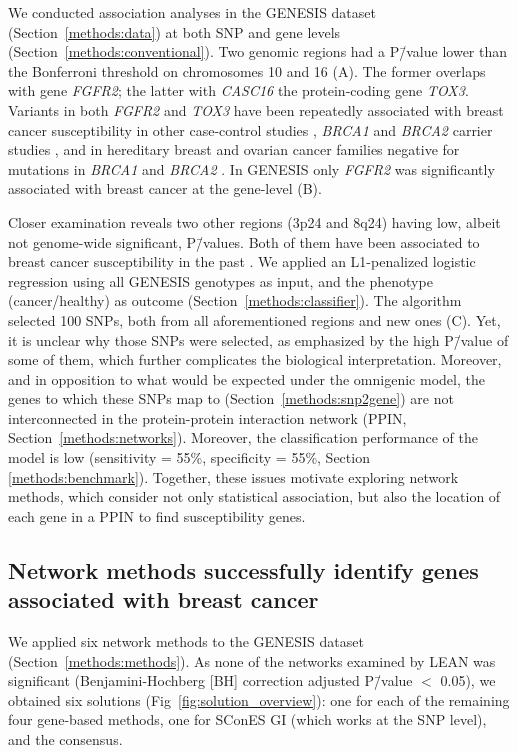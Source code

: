 \documentclass[10pt,letterpaper]{article}
\begin{document}
We conducted association analyses in the GENESIS dataset (Section~\ref{methods:data}) at both SNP and gene levels (Section~\ref{methods:conventional}). Two genomic regions had a P\=/value lower than the Bonferroni threshold on chromosomes 10 and 16 (A). The former overlaps with gene \emph{FGFR2}; the latter with \emph{CASC16} the protein-coding gene \emph{TOX3}. Variants in both \emph{FGFR2} and \emph{TOX3} have been repeatedly associated with breast cancer susceptibility in other case-control studies \cite{Michailidou2017}, \emph{BRCA1} and \emph{BRCA2} carrier studies \cite{Mulligan2011}, and in hereditary breast and ovarian cancer families negative for mutations in \emph{BRCA1} and \emph{BRCA2} \cite{rinella_genetic_2013}. In GENESIS only \emph{FGFR2} was significantly associated with breast cancer at the gene-level (B).

Closer examination reveals two other regions (3p24 and 8q24) having low, albeit not genome-wide significant, P\=/values. Both of them have been associated to breast cancer susceptibility in the past \cite{brisbin_meta-analysis_2011,search_newly_2009}. We applied an L1-penalized logistic regression using all GENESIS genotypes as input, and the phenotype (cancer/healthy) as outcome (Section~\ref{methods:classifier}). The algorithm selected 100 SNPs, both from all aforementioned regions and new ones (C). Yet, it is unclear why those SNPs were selected, as emphasized by the high P\=/value of some of them, which further complicates the biological interpretation. Moreover, and in opposition to what would be expected under the omnigenic model, the genes to which these SNPs map to (Section~\ref{methods:snp2gene}) are not interconnected in the protein-protein interaction network (PPIN, Section~\ref{methods:networks}). Moreover, the classification performance of the model is low (sensitivity = 55\%, specificity = 55\%, Section \ref{methods:benchmark}). Together, these issues motivate exploring network methods, which consider not only statistical association, but also the location of each gene in a PPIN to find susceptibility genes.

\subsection{Network methods successfully identify genes associated with breast cancer}
\label{results:separate_networks}

We applied six network methods to the GENESIS dataset (Section~\ref{methods:methods}). As none of the networks examined by LEAN was significant (Benjamini-Hochberg [BH] correction adjusted P\=/value $<$ 0.05), we obtained six solutions (Fig~\ref{fig:solution_overview}): one for each of the remaining four gene-based methods, one for SConES GI (which works at the SNP level), and the consensus.
\end{document}
